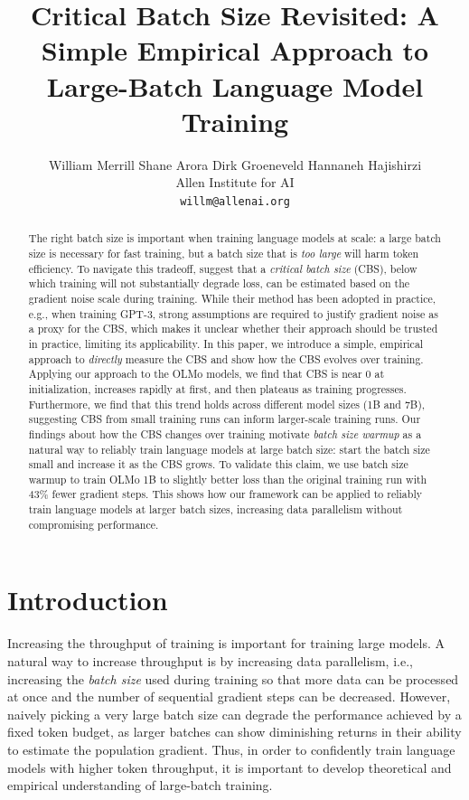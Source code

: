 \documentclass{article}
\title{Critical Batch Size Revisited: A Simple Empirical Approach to Large-Batch Language Model Training}
\author{%
  William Merrill \quad
  Shane Arora \quad
  Dirk Groeneveld \quad
  Hannaneh Hajishirzi \\
  Allen Institute for AI \\
  \texttt{willm@allenai.org}
}
\begin{document}
\maketitle


\begin{abstract}
    The right batch size is important when training language models at scale: a large batch size is necessary for fast training, but a batch size that is \emph{too large} will harm token efficiency. To navigate this tradeoff, \citet{mccandlish2018empirical} suggest that a \emph{critical batch size} (CBS), below which training will not substantially degrade loss, can be estimated based on the gradient noise scale during training. While their method has been adopted in practice, e.g., when training GPT-3, strong assumptions are required to justify gradient noise as a proxy for the CBS, which makes it unclear whether their approach should be trusted in practice, limiting its applicability. In this paper, we introduce a simple, empirical approach to \emph{directly} measure the CBS and show how the CBS evolves over training. Applying our approach to the OLMo models, we find that CBS is near 0 at initialization, increases rapidly at first, and then plateaus as training progresses. Furthermore, we find that this trend holds across different model sizes (1B and 7B), suggesting CBS from small training runs can inform larger-scale training runs. Our findings about how the CBS changes over training motivate \emph{batch size warmup} as a natural way to reliably train language models at large batch size: start the batch size small and increase it as the CBS grows. To validate this claim, we use batch size warmup to train OLMo 1B to slightly better loss than the original training run with 43\% fewer gradient steps. This shows how our framework can be applied to reliably train language models at larger batch sizes, increasing data parallelism without compromising performance.
\end{abstract}


\section{Introduction}

Increasing the throughput of training is important for training large models.
A natural way to increase throughput is by increasing data parallelism, i.e., increasing the \emph{batch size} used during training so that more data can be processed at once and the number of sequential gradient steps can be decreased.
However, naively picking a very large batch size can degrade the performance achieved by a fixed token budget, as larger batches can show diminishing returns in their ability to estimate the population gradient.
Thus, in order to confidently train language models with higher token throughput, it is important to develop theoretical and empirical understanding of large-batch training.
\end{document}
